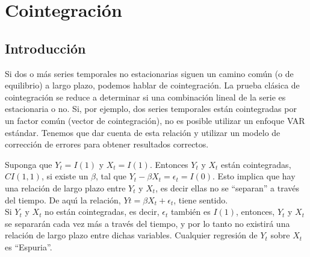 \section{Cointegraci\'on}
\subsection{Introducción}
	
		Si dos o más series temporales no estacionarias siguen un camino común (o  de equilibrio) a largo plazo, podemos hablar de cointegraci\'on. La prueba cl\'asica de cointegraci\'on se reduce a determinar si una combinaci\'on lineal de la serie es estacionaria o no. Si, por ejemplo, dos series temporales est\'an cointegradas por un factor com\'un (vector de cointegraci\'on), no es posible utilizar un enfoque VAR est\'andar. Tenemos que dar cuenta de esta relaci\'on y utilizar un modelo de correcci\'on de errores para obtener resultados correctos.




		Suponga que $Y_t = I(1)$ y $X_t=I(1)$. Entonces $Y_t$ y $X_t$ est\'an cointegradas, $CI(1,1)$, si existe un $\beta$, tal que $Y_t - \beta X_t = \epsilon_t = I(0)$. Esto implica que hay una relaci\'on de largo plazo entre $Y_t$ y $X_t$,  es decir ellas no se ``separan” a trav\'es del tiempo. De aqu\'\i{} la relaci\'on, $Yt= \beta X_t + \epsilon_t$, tiene sentido.\\
		\vspace{4mm}	
		Si $Y_t$ y $X_t$ no est\'an cointegradas, es decir, $\epsilon_t$ tambi\'en es $I(1)$, entonces, $Y_t$ y $X_t$ se separar\'an cada vez más a trav\'es del tiempo, y por lo tanto no existir\'a una relaci\'on de largo plazo entre dichas variables. Cualquier regresi\'on de $Y_t$ sobre $X_t$ es ``Espuria”.
		
		
%	
		
